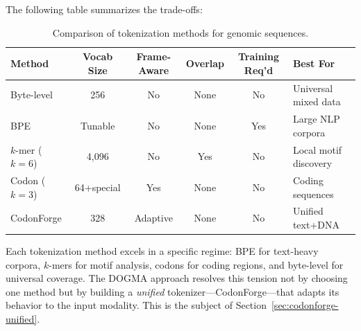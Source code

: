 The following table summarizes the trade-offs:

\begin{table}[H]
\centering
\caption{Comparison of tokenization methods for genomic sequences.}
\label{tab:tokenization-comparison}
\begin{tabularx}{\textwidth}{L{2.8cm} c c c c Y}
\toprule
\textbf{Method} & \textbf{Vocab Size} & \textbf{Frame-Aware} & \textbf{Overlap} & \textbf{Training Req'd} & \textbf{Best For} \\
\midrule
Byte-level & 256 & No & None & No & Universal mixed data \\
BPE & Tunable & No & None & Yes & Large NLP corpora \\
$k$-mer ($k{=}6$) & 4,096 & No & Yes & No & Local motif discovery \\
Codon ($k{=}3$) & 64+special & Yes & None & No & Coding sequences \\
CodonForge & 328 & Adaptive & None & No & Unified text+DNA \\
\bottomrule
\end{tabularx}
\end{table}

\begin{keyinsight}
Each tokenization method excels in a specific regime: BPE for text-heavy corpora, $k$-mers for motif analysis, codons for coding regions, and byte-level for universal coverage. The DOGMA approach resolves this tension not by choosing one method but by building a \emph{unified} tokenizer---CodonForge---that adapts its behavior to the input modality. This is the subject of Section~\ref{sec:codonforge-unified}.
\end{keyinsight}


